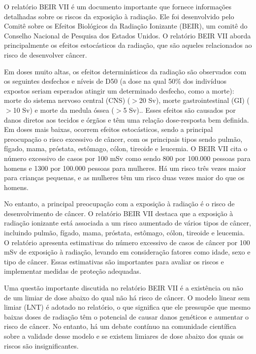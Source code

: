 \documentclass[11pt,a4paper]{article}
\begin{document}
	O relatório BEIR VII é um documento importante que fornece informações detalhadas sobre os riscos da exposição à radiação. Ele foi desenvolvido pelo Comitê sobre os Efeitos Biológicos da Radiação Ionizante (BEIR), um comitê do Conselho Nacional de Pesquisa dos Estados Unidos. O relatório BEIR VII aborda principalmente os efeitos estocásticos da radiação, que são aqueles relacionados ao risco de desenvolver câncer.

	Em doses muito altas, os efeitos determinísticos da radiação são observados com os seguintes desfechos e níveis de D50 (a dose na qual 50\% dos indivíduos expostos seriam esperados atingir um determinado desfecho, como a morte): morte do sistema nervoso central (CNS) ($>$20 Sv), morte gastrointestinal (GI) ($>$10 Sv) e morte da medula óssea ($>$5 Sv).. Esses efeitos são causados por danos diretos aos tecidos e órgãos e têm uma relação dose-resposta bem definida. Em doses mais baixas, ocorrem efeitos estocásticos, sendo a principal preocupação o risco excessivo de câncer, com os principais tipos sendo pulmão, fígado, mama, próstata, estômago, cólon, tireoide e leucemia. O BEIR VII cita o número excessivo de casos por 100 mSv como sendo 800 por 100.000 pessoas para homens e 1300 por 100.000 pessoas para mulheres. Há um risco três vezes maior para crianças pequenas, e as mulheres têm um risco duas vezes maior do que os homens.

	No entanto, a principal preocupação com a exposição à radiação é o risco de desenvolvimento de câncer. O relatório BEIR VII destaca que a exposição à radiação ionizante está associada a um risco aumentado de vários tipos de câncer, incluindo pulmão, fígado, mama, próstata, estômago, cólon, tireoide e leucemia. O relatório apresenta estimativas do número excessivo de casos de câncer por 100 mSv de exposição à radiação, levando em consideração fatores como idade, sexo e tipo de câncer. Essas estimativas são importantes para avaliar os riscos e implementar medidas de proteção adequadas.

	Uma questão importante discutida no relatório BEIR VII é a existência ou não de um limiar de dose abaixo do qual não há risco de câncer. O modelo linear sem limiar (LNT) é adotado no relatório, o que significa que ele pressupõe que mesmo baixas doses de radiação têm o potencial de causar danos genéticos e aumentar o risco de câncer. No entanto, há um debate contínuo na comunidade científica sobre a validade desse modelo e se existem limiares de dose abaixo dos quais os riscos são insignificantes.
\end{document}
